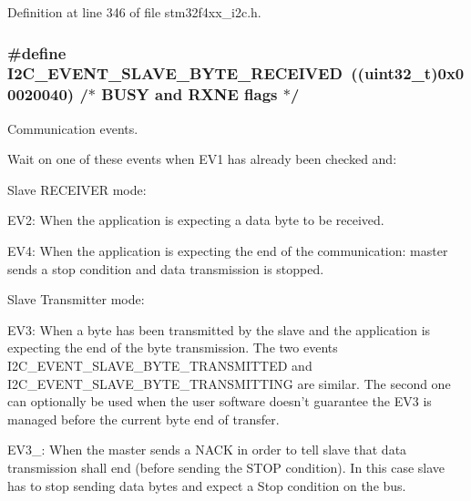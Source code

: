 Definition at line 346 of file stm32f4xx\-\_\-i2c.\-h.

\hypertarget{group___i2_c___events_ga8b244626839940569c6c8bbfc4efe21d}{
\subsubsection[{I2\-C\-\_\-\-E\-V\-E\-N\-T\-\_\-\-S\-L\-A\-V\-E\-\_\-\-B\-Y\-T\-E\-\_\-\-R\-E\-C\-E\-I\-V\-E\-D}]{\setlength{\rightskip}{0pt plus 5cm}\#define I2\-C\-\_\-\-E\-V\-E\-N\-T\-\_\-\-S\-L\-A\-V\-E\-\_\-\-B\-Y\-T\-E\-\_\-\-R\-E\-C\-E\-I\-V\-E\-D~((uint32\-\_\-t)0x00020040)  /$\ast$ B\-U\-S\-Y and R\-X\-N\-E flags $\ast$/}}\label{group___i2_c___events_ga8b244626839940569c6c8bbfc4efe21d}


Communication events. 

Wait on one of these events when E\-V1 has already been checked and\-:
\begin{DoxyItemize}
\item Slave R\-E\-C\-E\-I\-V\-E\-R mode\-:
\begin{DoxyItemize}
\item E\-V2\-: When the application is expecting a data byte to be received.
\item E\-V4\-: When the application is expecting the end of the communication\-: master sends a stop condition and data transmission is stopped.
\end{DoxyItemize}
\item Slave Transmitter mode\-:
\begin{DoxyItemize}
\item E\-V3\-: When a byte has been transmitted by the slave and the application is expecting the end of the byte transmission. The two events I2\-C\-\_\-\-E\-V\-E\-N\-T\-\_\-\-S\-L\-A\-V\-E\-\_\-\-B\-Y\-T\-E\-\_\-\-T\-R\-A\-N\-S\-M\-I\-T\-T\-E\-D and I2\-C\-\_\-\-E\-V\-E\-N\-T\-\_\-\-S\-L\-A\-V\-E\-\_\-\-B\-Y\-T\-E\-\_\-\-T\-R\-A\-N\-S\-M\-I\-T\-T\-I\-N\-G are similar. The second one can optionally be used when the user software doesn't guarantee the E\-V3 is managed before the current byte end of transfer.
\item E\-V3\-\_\-: When the master sends a N\-A\-C\-K in order to tell slave that data transmission shall end (before sending the S\-T\-O\-P condition). In this case slave has to stop sending data bytes and expect a Stop condition on the bus.
\end{DoxyItemize}
\end{DoxyItemize}

